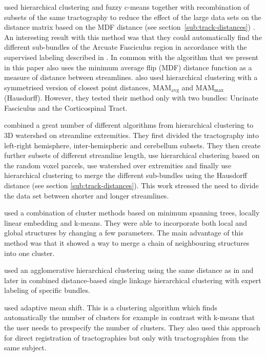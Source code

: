 \documentclass{bioinfo}
\begin{document}
\citet{Visser2010} used hierarchical clustering and fuzzy c-means
together with recombination of subsets of the same tractography to
reduce the effect of the large data sets on the distance matrix based on
the MDF distance (see section~\ref{sub:track-distances})
\citep{EGMB10}. An interesting result with this method was that they
could automatically find the different sub-bundles of the Arcuate
Fasciculus region in accordance with the supervised labeling described
in \citet{catani2005perisylvian}. In common with \citet{Visser2010} the
algorithm that we present in this paper also uses the minimum average
flip (MDF) distance function as a measure of distance between
streamlines. \citet{gerig2004analysis} also used hierarchical clustering
with a symmetrised version of closest point distances,
$\mathrm{MA}\mathrm{M}_{\mathrm{avg}}$ and
$\mathrm{MA}\mathrm{M}_{\mathrm{max}}$ (Hausdorff). However, they tested
their method only with two bundles: Uncinate Fasciculus and the
Corticospinal Tract.

\citet{Guevara2010} combined a great number of different algorithms from
hierarchical clustering to 3D watershed on streamline extremities.  They
first divided the tractography into left-right hemisphere,
inter-hemispheric and cerebellum subsets. They then create further
subsets of different streamline length, use hierarchical clustering
based on the random voxel parcels, use watershed over extremities and
finally use hierarchical clustering to merge the different sub-bundles
using the Hausdorff distance (see section
\ref{sub:track-distances}). This work stressed the need to divide the
data set between shorter and longer streamlines.

\citet{Tsai2007} used a combination of cluster methods based on minimum
spanning trees, locally linear embedding and k-means.  They were able to
incorporate both local and global structures by changing a few
parameters. The main advantage of this method was that it showed a way
to merge a chain of neighbouring structures into one cluster.

\citet*{zhang2005dti} used an agglomerative hierarchical clustering
using the same distance as in \citet{zhang2003visualizing} and later in
\citet{zhang2008identifying} combined distance-based single linkage
hierarchical clustering with expert labeling of specific
bundles. 

\citet{zvitia2008adaptive, Zvitia2010} used adaptive mean shift. This is
a clustering algorithm which finds automatically the number of clusters
for example in contrast with k-means that the user needs to prespecify
the number of clusters.  They also used this approach for direct
registration of tractographies but only with tractographies from the
same subject.
\end{document}
